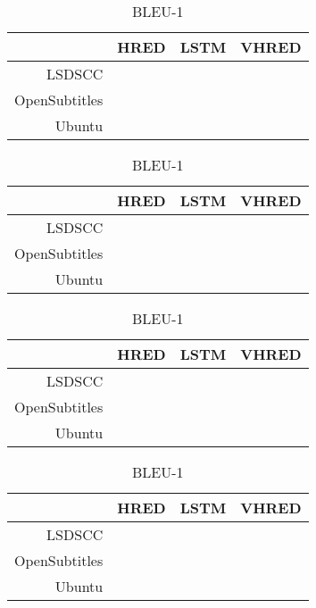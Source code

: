\begin{table}[H]
    \centering
    \begin{subtable}{0.5\linewidth}
        \centering
        \caption{BLEU-1}
        \label{subtab:BLEU-1}
        \begin{tabularx}{\linewidth}{rXXX}
            \toprule
            & HRED & LSTM & VHRED \\
            \midrule
            LSDSCC & & &  \\
            OpenSubtitles & & &  \\
            Ubuntu & & &  \\
            \bottomrule
        \end{tabularx}
    \end{subtable}%
    \begin{subtable}{0.5\linewidth}
        \centering
        \caption{BLEU-1}
        \label{subtab:BLEU-2}
        \begin{tabularx}{\linewidth}{rXXX}
            \toprule
            & HRED & LSTM & VHRED \\
            \midrule
            LSDSCC & & &  \\
            OpenSubtitles & & &  \\
            Ubuntu & & &  \\
            \bottomrule
        \end{tabularx}
    \end{subtable}
    \begin{subtable}{0.5\linewidth}
        \centering
        \caption{BLEU-1}
        \label{subtab:BLEU-3}
        \begin{tabularx}{\linewidth}{rXXX}
            \toprule
            & HRED & LSTM & VHRED \\
            \midrule
            LSDSCC & & &  \\
            OpenSubtitles & & &  \\
            Ubuntu & & &  \\
            \bottomrule
        \end{tabularx}
    \end{subtable}%
    \begin{subtable}{0.5\linewidth}
        \centering
        \caption{BLEU-1}
        \label{subtab:BLEU-4}
        \begin{tabularx}{\linewidth}{rXXX}
            \toprule
            & HRED & LSTM & VHRED \\
            \midrule
            LSDSCC & & &  \\
            OpenSubtitles & & &  \\
            Ubuntu & & &  \\
            \bottomrule
        \end{tabularx}
    \end{subtable}
\end{table}